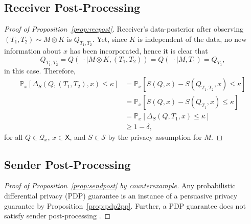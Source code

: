 \documentclass{article}
\theoremstyle{plain}
\theoremstyle{plain}
\theoremstyle{definition}
\theoremstyle{remark}
\theoremstyle{plain}
\newcommand{\cdotmid}{\;\cdot \mid}
\renewcommand{\Pr}{\mathbb{P}}
\newcommand{\PrMx}{\Pr_{x}}
\newcommand{\xset}{\mathsf{X}}
\begin{document}
\subsection{Receiver Post-Processing}\label{proof:recpost}
\begin{proof}[Proof of Proposition~\ref{prop:recpost}]
Receiver's data-posterior after observing $(T_1,T_2)\sim M \otimes K$ is $Q_{T_1,T_2}$. Yet, since $K$ is independent of the data, no new information about $x$ has been incorporated, hence it is clear that 
    \begin{equation*}
        Q_{T_1,T_2} = Q(\cdotmid M \otimes K, (T_1,T_2))= Q(\cdotmid M, T_1) = Q_{T_1},
    \end{equation*}
in this case. Therefore, 
\begin{align*}
\PrMx\left[\Delta_S(Q,(T_1,T_2),x) \leq \kappa \right] & = \PrMx\left[S(Q,x) - S(Q_{T_1,T_2}, x) \leq \kappa \right]\\
& = \PrMx\left[S(Q,x) - S(Q_{T_1}, x) \leq \kappa \right]\\
& = \PrMx\left[\Delta_S(Q,T_1,x) \leq \kappa \right] \\
& \geq 1 - \delta,
\end{align*}
for all $Q \in\mathcal{Q}_x$, $x \in \xset$, and $S \in \mathcal{S}$ by the privacy assumption for $M$.
\end{proof}
\subsection{Sender Post-Processing}\label{proof:sendpost}
\begin{proof}[Proof of Proposition~\ref{prop:sendpost} by counterexample]
    Any probabilistic differential privacy (PDP) guarantee is an instance of a persuasive privacy guarantee by Proposition~\ref{prop:pdp2pp}.
    Further, a PDP guarantee does not satisfy sender post-processing \citep[i.e., the post-processing inequality,][]{kifer2012axiomatic,meiser2018approximate}.
\end{proof}
\end{document}
